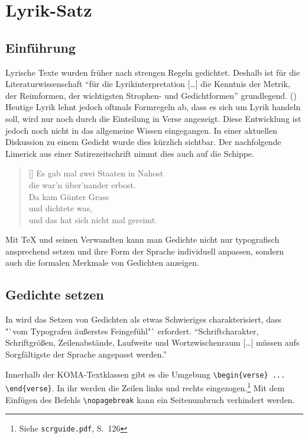 \section{Lyrik-Satz}
 

\subsection{Einführung}
Lyrische Texte wurden früher nach strengen Regeln gedichtet. Deshalb ist für 
die Literaturwissenschaft "`für
die Lyrikinterpretation [\ldots] die Kenntnis der Metrik, der Reimformen, der
wichtigsten Strophen- und Gedichtformen"' grundlegend. (\cite[8]{Neuhaus})
Heutige Lyrik lehnt jedoch oftmals Formregeln ab, dass es sich um Lyrik handeln
soll, wird nur noch durch die Einteilung in Verse angezeigt. Diese Entwicklung ist
jedoch noch nicht in das allgemeine Wissen eingegangen. In einer aktuellen Diskussion 
zu einem Gedicht wurde dies kürzlich sichtbar. Der nachfolgende 
Limerick \cite{Svoboda} aus einer Satirezeitschrift nimmt dies auch auf die Schippe.
\settowidth{\versewidth}{und das hat sich nicht mal gereimt.}
\begin{verse}[\versewidth]
Es gab mal zwei Staaten in Nahost\\
die war'n über'nander erbost.\\
\vin Da kam Günter Grass\\
\vin \vin und dichtete was,\\
und das hat sich nicht mal gereimt.\\
\end{verse}

Mit \TeX{} und seinen Verwandten kann man Gedichte nicht nur typografisch
ansprechend setzen  und ihre Form der Sprache individuell anpassen, sondern auch die 
formalen Merkmale von Gedichten anzeigen. 

\subsection{Gedichte setzen}

In \cite[94]{lesetypografie2010} wird das Setzen von Gedichten als etwas Schwieriges
charakterisiert, dass "`vom Typografen äußerstes Feingefühl"` erfordert. "`Schriftcharakter, Schriftgrößen, Zeilenabstände, Laufweite und Wortzwischenraum [\ldots] müssen aufs Sorgfältigste der Sprache angepasst werden."'

Innerhalb der KOMA-Textklassen gibt es die Umgebung \verb|\begin{verse} ... \end{verse}|.
In ihr werden die Zeilen links und rechts eingezogen.\footnote{Siehe \texttt{scrguide.pdf},
S.~126}
Mit dem Einfügen des Befehls \verb|\nopagebreak| kann ein Seitenumbruch verhindert werden. 


